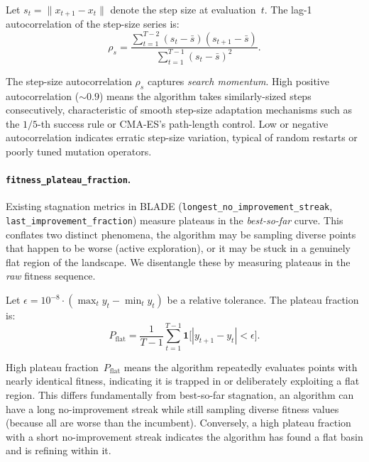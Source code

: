 Let $s_t = \lVert x_{t+1} - x_t \rVert$ denote the step size at evaluation~$t$.
The lag-1 autocorrelation of the step-size series is:
\begin{equation}
\label{eq:ssac}
  \rho_s
    = \frac{\sum_{t=1}^{T-2}(s_t - \bar{s})(s_{t+1} - \bar{s})}
           {\sum_{t=1}^{T-1}(s_t - \bar{s})^2}.
\end{equation}

The step-size autocorrelation $\rho_s$ captures \emph{search momentum}. High positive autocorrelation (${\sim}0.9$) means the algorithm takes similarly-sized steps consecutively, characteristic of smooth step-size adaptation mechanisms such as the $1/5$-th success rule or CMA-ES's path-length control. Low or negative autocorrelation indicates erratic step-size variation, typical of random restarts or poorly
tuned mutation operators.

\paragraph{\texttt{fitness\_plateau\_fraction}.}
\label{sec:features:novel:plateau}

Existing stagnation metrics in BLADE (\texttt{longest\_no\_improvement\_streak},
\texttt{last\_improvement\_fraction}) measure plateaus in the \emph{best-so-far}
curve.  This conflates two distinct phenomena, the algorithm may be sampling diverse points that happen to be worse (active exploration), or it may be stuck in a genuinely flat region of the landscape.  We disentangle these by measuring plateaus in the \emph{raw} fitness sequence.

Let $\epsilon = 10^{-8} \cdot (\max_t y_t - \min_t y_t)$ be a relative
tolerance.  The plateau fraction is:
\begin{equation}
\label{eq:plateau}
  P_{\mathrm{flat}}
    = \frac{1}{T-1}\sum_{t=1}^{T-1}
      \mathbf{1}\!\bigl[|y_{t+1} - y_t| < \epsilon\bigr].
\end{equation}

High plateau fraction~$P_{\mathrm{flat}}$ means the algorithm repeatedly evaluates points with nearly identical fitness, indicating it is trapped in or deliberately exploiting a flat region.  This differs fundamentally from best-so-far stagnation, an algorithm can have a long no-improvement streak while still sampling diverse fitness values (because all are worse than the incumbent).  Conversely, a high plateau fraction with a short no-improvement streak indicates the algorithm has found a flat basin and is refining within it.


